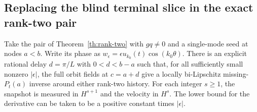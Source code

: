\subsection{Replacing the blind terminal slice in the exact rank-two pair}
\label{sec:exact-rank-recovery}

\begin{theorem}
\label{th:exact-rank-recovery}
Take the pair of Theorem~\ref{th:rank-two}
with $gq\ne0$ and a single-mode seed at nodes $a<b$.
Write its phase as $w_\epsilon=\epsilon u_{k_0}(t)\cos(k_0\theta)$.
There is an explicit rational delay $d=\pi/L$ with
$0<d<b-a$ such that, for all sufficiently small
nonzero $|\epsilon|$, the full orbit fields at
$c=a+d$ give a locally bi-Lipschitz missing-$P_t(a)$
inverse around either rank-two history.
For each integer $s\ge1$, the snapshot is measured
in $H^{s+1}$ and the velocity in $H^s$.
The lower bound for the derivative can be taken
to be a positive constant times $|\epsilon|$.
\end{theorem}

